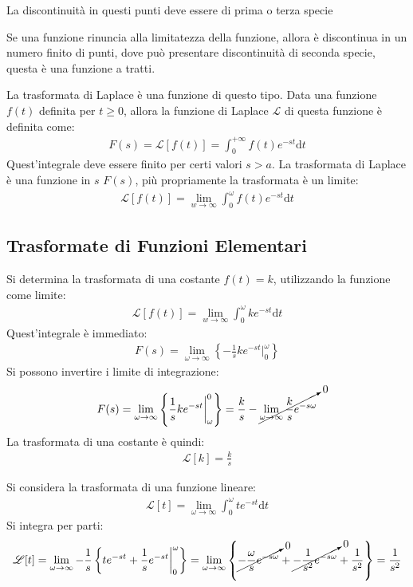 \documentclass{article}
\newcommand{\df}{\mathrm{d}}
\newcommand{\intab}[4]{\displaystyle\int_{#1}^{#2}{#3}\df{#4}}
\newcommand{\intpinf}[2]{\intab{0}{+\infty}{#1}{#2}}
\numberwithin{equation}{subsection}
\begin{document}

La discontinuità in questi punti deve essere di prima o terza specie%

Se una funzione rinuncia alla limitatezza della funzione, allora è discontinua in un numero finito di punti, dove può presentare discontinuità di seconda specie, questa è una funzione a tratti. 


La trasformata di Laplace è una funzione di questo tipo. Data una funzione $f(t)$ definita per $t\geq0$, allora la funzione di Laplace $\mathscr{L}$ di questa funzione è definita come:
\begin{gather*}
    F(s)=\mathscr{L}[f(t)]=\intpinf{f(t)e^{-st}}{t}
\end{gather*}
Quest'integrale deve essere finito per certi valori $s>a$. La trasformata di Laplace è una funzione in $s$ $F(s)$, più propriamente la trasformata è un limite:
\begin{gather*}
    \mathscr{L}[f(t)]=\lim_{w\to\infty}\int_0^\omega f(t)e^{-st}\df t
\end{gather*}

\subsection{Trasformate di Funzioni Elementari}

Si determina la trasformata di una costante $f(t)=k$, utilizzando la funzione come limite:
\begin{gather*}
    \mathscr{L}[f(t)]=\lim_{w\to\infty}\int_0^\omega ke^{-st}\df t
\end{gather*}
Quest'integrale è immediato:
\begin{gather*}
    F(s)=\lim_{\omega\to\infty}\left\{-\frac{1}{s}ke^{-st}\bigg|_0^\omega\right\}
\end{gather*}
Si possono invertire i limite di integrazione:
\begin{gather*}
    F(s)=\lim_{\omega\to\infty}\left\{\frac{1}{s}ke^{-st}\bigg|_\omega^0\right\}=
    \frac{k}{s}-\cancelto{0}{\lim_{\omega\to\infty}\frac{k}{s}e^{-s\omega}}
\end{gather*}
La trasformata di una costante è quindi:
\begin{gather*}
    \mathscr{L}[k]=\frac{k}{s}
\end{gather*}


Si considera la trasformata di una funzione lineare:
\begin{gather*}
    \mathscr{L}[t]=\lim_{\omega\to\infty}\int_0^\omega te^{-st}\df t
\end{gather*}
Si integra per parti:
\begin{gather*}
    \mathscr{L}[t]=\lim_{\omega\to\infty}-\frac{1}{s}\left\{te^{-st}+\frac{1}{s}e^{-st}\bigg|_0^\omega\right\}=
    \lim_{\omega\to\infty}\left\{\cancelto{0}{-\frac{\omega}{s} e^{-s\omega}}+\cancelto{0}{-\frac{1}{s^2}e^{-s\omega}}+\frac{1}{s^2}\right\}=\frac{1}{s^2}
\end{gather*}
\end{document}
